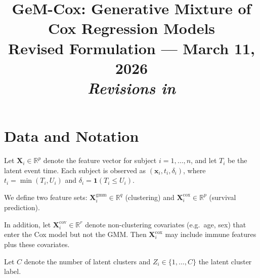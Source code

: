 \documentclass[11pt]{article}
\title{\textbf{GeM-Cox: Generative Mixture of Cox Regression Models}\\[4pt]
\large Revised Formulation --- March 11, 2026\\[4pt]
\normalsize\textit{Revisions in} \rev{blue}}
\date{}
\newcommand{\bx}{\mathbf{x}}
\newcommand{\bX}{\mathbf{X}}
\newenvironment{revblock}{\color{revcolor}}{}
\begin{document}
\maketitle
\tableofcontents
\newpage

\section{Data and Notation}

Let $\bX_i\!\in\!\mathbb{R}^p$ denote the feature vector for subject $i=1,\ldots,n$, and let $T_i$ be the latent event time. Each subject is observed as $(\bx_i, t_i, \delta_i)$, where $t_i = \min(T_i, U_i)$ and $\delta_i = \mathbf{1}(T_i \le U_i)$.

We define two feature sets: $\bX_i^{\mathrm{gmm}}\!\in\!\mathbb{R}^q$ (clustering) and $\bX_i^{\mathrm{cox}}\!\in\!\mathbb{R}^p$ (survival prediction).

\begin{revblock}
In addition, let $\bX_i^{\mathrm{cov}}\!\in\!\mathbb{R}^r$ denote non-clustering covariates (e.g.\ age, sex) that enter the Cox model but not the GMM. Then $\bX_i^{\mathrm{cox}}$ may include immune features plus these covariates.
\end{revblock}

Let $C$ denote the number of latent clusters and $Z_i\in\{1,\ldots,C\}$ the latent cluster label.
\end{document}
